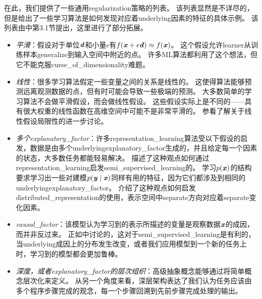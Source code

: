 
在此，我们提供了一些通用\gls{regularization}策略的列表。
该列表显然是不详尽的，但是给出了一些学习算法是如何发现对应着\gls{underlying}因素的特征的具体示例。
该列表由\cite{Bengio-Courville-Vincent-TPAMI-2012}中第3.1节提出，这里进行了部分拓展。
\begin{itemize}
	\item \emph{平滑}：假设对于单位$\boldsymbol{\mathit{d}}$和小量$\epsilon$有$f(\boldsymbol{\mathit{x}} + \epsilon \boldsymbol{\mathit{d}}) \approx f(\boldsymbol{\mathit{x}})$。
	这个假设允许\gls{learner}从训练样本\gls{generalize}到输入空间中附近的点。
	许多\gls{ML}算法都利用了这个想法，但它不能克服\gls{curse_of_dimensionality}难题。


	\item \emph{线性}：很多学习算法假定一些变量之间的关系是线性的。
	这使得算法能够预测远离观测数据的点，但有时可能会导致一些极端的预测。
	大多数简单的学习算法不会做平滑假设，而会做线性假设。
	这些假设实际上是不同的——具有很大权重的线性函数在高维空间中可能不是非常平滑的。
	参看\cite{Goodfellow-2015-adversarial}了解关于线性假设局限性的进一步讨论。


	\item \emph{多个\gls{explanatory_factor}}：许多\gls{representation_learning}算法受以下假设的启发，数据是由多个\gls{underlying}\gls{explanatory_factor}生成的，并且给定每一个因素的状态，大多数任务都能轻易解决。
	描述了这种观点如何通过\gls{representation_learning}启发\gls{semi_supervised_learning}的。
	学习$p(\boldsymbol{\mathit{x}})$的结构要求学习出一些对建模$p(\boldsymbol{\mathit{y}}\mid\boldsymbol{\mathit{x}})$同样有用的特征，因为它们都涉及到相同的\gls{underlying}\gls{explanatory_factor}。
	介绍了这种观点如何启发\gls{distributed_representation}的使用，表示空间中\gls{separate}方向对应着\gls{separate}变化因素。


	\item \emph{\gls{causal_factor}}：该模型认为学习到的表示所描述的变量是观察数据$\boldsymbol{\mathit{x}}$的成因，而并非反过来。
	正如中讨论的，这对于\gls{semi_supervised_learning}是有利的，当\gls{underlying}成因上的分布发生改变，或者我们应用模型到一个新的任务上时，学习到的模型都会更加鲁棒。


	\item \emph{深度，或者\gls{explanatory_factor}的层次组织}：高级抽象概念能够通过将简单概念层次化来定义。
	从另一个角度来看，深层架构表达了我们认为任务应该由多个程序步骤完成的观念，每一个步骤回溯到先前步骤完成处理的输出。



\end{itemize}
